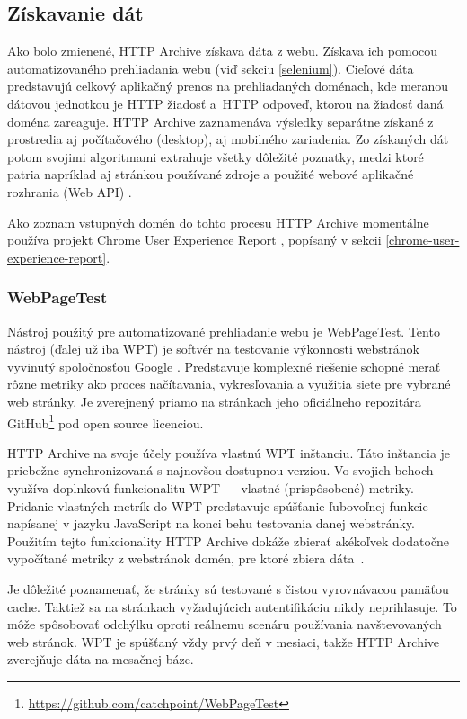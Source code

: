 \subsection{Získavanie dát}
\label{fetching-data}

Ako bolo zmienené, HTTP Archive získava dáta z webu. 
Získava ich pomocou automatizovaného prehliadania webu (viď sekciu \ref{selenium}).
Cieľové dáta predstavujú celkový aplikačný prenos na prehliadaných doménach, kde meranou dátovou jednotkou je HTTP žiadosť \mbox{a HTTP} odpoveď, ktorou na žiadosť daná doména zareaguje.
HTTP Archive zaznamenáva výsledky separátne získané z prostredia aj počítačového (desktop), aj mobilného zariadenia.
Zo získaných dát potom svojimi algoritmami extrahuje všetky dôležité poznatky, medzi ktoré patria napríklad aj stránkou používané zdroje a použité webové aplikačné rozhrania (Web API) \cite{httparchive-homepage}.

Ako zoznam vstupných domén do tohto procesu HTTP Archive momentálne používa projekt Chrome User Experience Report \cite{httparchive-faq}, popísaný v sekcii \ref{chrome-user-experience-report}.

\subsubsection{WebPageTest}

Nástroj použitý pre automatizované prehliadanie webu je WebPageTest. 
Tento nástroj (ďalej už iba WPT) je softvér na testovanie výkonnosti webstránok vyvinutý spoločnosťou Google \cite{webpagetest}. 
Predstavuje komplexné riešenie schopné merať rôzne metriky ako proces načítavania, vykresľovania a využitia siete pre vybrané web stránky. 
Je zverejnený priamo na stránkach jeho oficiálneho repozitára GitHub\footnote{\url{https://github.com/catchpoint/WebPageTest}} pod open source licenciou.

HTTP Archive na svoje účely používa vlastnú WPT inštanciu. 
Táto inštancia je priebežne synchronizovaná s najnovšou dostupnou verziou.
Vo svojich behoch využíva doplnkovú funkcionalitu WPT --- vlastné (prispôsobené) metriky.
Pridanie vlastných metrík do WPT predstavuje spúšťanie ľubovoľnej funkcie napísanej v jazyku JavaScript na konci behu testovania danej webstránky. 
Použitím tejto funkcionality HTTP Archive dokáže zbierať akékoľvek dodatočne vypočítané metriky z webstránok domén, pre ktoré zbiera \mbox{dáta \cite{webpagetest}}.

Je dôležité poznamenať, že stránky sú testované s čistou vyrovnávacou pamäťou cache. 
Taktiež sa na stránkach vyžadujúcich autentifikáciu nikdy neprihlasuje.
To môže spôsobovať odchýlku oproti reálnemu scenáru používania navštevovaných web stránok. 
WPT je spúšťaný vždy prvý deň v mesiaci, takže HTTP Archive zverejňuje dáta na mesačnej báze.

